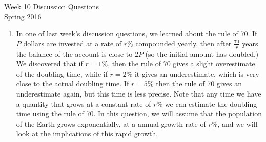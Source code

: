 \documentclass[11pt,dvipsnames]{article}
\begin{document}
\begin{center}
Week 10 Discussion Questions\\
Spring 2016
\end{center}
\begin{enumerate}[label= {\bf  \arabic*:}]
\item In one of last week's discussion questions, we learned about the rule of 70. If $P$ dollars are invested at a rate of $r\%$ compounded yearly, then after $\displaystyle \frac{70}{r}$ years the balance of the account is close to $2P$ (so the initial amount has doubled.) We discovered that if $r=1\%$, then the rule of 70 gives a slight overestimate of the doubling time, while if $r=2\%$ it gives an underestimate, which is very close to the actual doubling time. If $r=5\%$ then the rule of 70 gives an underestimate again, but this time is less precise. Note that any time we have a quantity that grows at a constant rate of $r\%$ we can estimate the doubling time using the rule of 70. In this question, we will assume that the population of the Earth grows exponentially, at a annual growth rate of $r\%$, and we will look at the implications of this rapid growth.


\end{enumerate}
\end{document}
